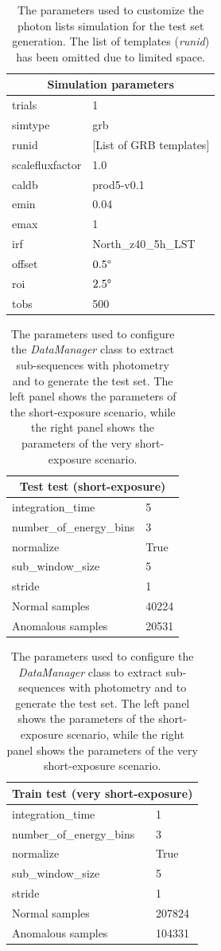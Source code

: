 \begin{table}[]
\centering
\begin{tabular}{|l|l|}
\hline
\multicolumn{2}{|c|}{\textbf{Simulation parameters}} \\
\hline
trials          & 1                   \\ 
simtype         & grb                 \\ 
runid           &  [List of GRB templates] \\ 
scalefluxfactor & 1.0                 \\ 
caldb           & prod5-v0.1          \\ 
emin            & 0.04                \\ 
emax            & 1                   \\ 
irf             & North\_z40\_5h\_LST \\ 
offset          & $0.5\degree$        \\ 
roi             & $2.5\degree$        \\ 
tobs            & 500                 \\ \hline
\end{tabular}
\caption{The parameters used to customize the photon lists simulation for the test set generation. The list of templates (\textit{runid}) has been omitted due to limited space.}
\label{tab:test-set-fits}
\end{table}
\begin{table}[]
\centering
\begin{tabular}{|l|l|}
\hline
\multicolumn{2}{|c|}{\textbf{Test test (short-exposure)}} \\
\hline
integration\_time  & 5 \\ 
number\_of\_energy\_bins & 3 \\ 
normalize & True \\ 
sub\_window\_size & 5 \\ 
stride & 1 \\ 
Normal samples & 40224\\ 
Anomalous samples & 20531 \\  \hline
\end{tabular}
\quad
\begin{tabular}{|l|l|}
\hline
\multicolumn{2}{|c|}{\textbf{Train test (very short-exposure)}} \\
\hline
integration\_time  & 1 \\ 
number\_of\_energy\_bins & 3 \\ 
normalize & True \\ 
sub\_window\_size & 5 \\ 
stride & 1 \\ 
Normal samples & 207824\\ 
Anomalous samples & 104331 \\ \hline
\end{tabular}
\caption{The parameters used to configure the \textit{DataManager} class to extract sub-sequences with photometry and to generate the test set. The left panel shows the parameters of the short-exposure scenario, while the right panel shows the parameters of the very short-exposure scenario.}
\label{tab:test-set-ts}
\end{table}



